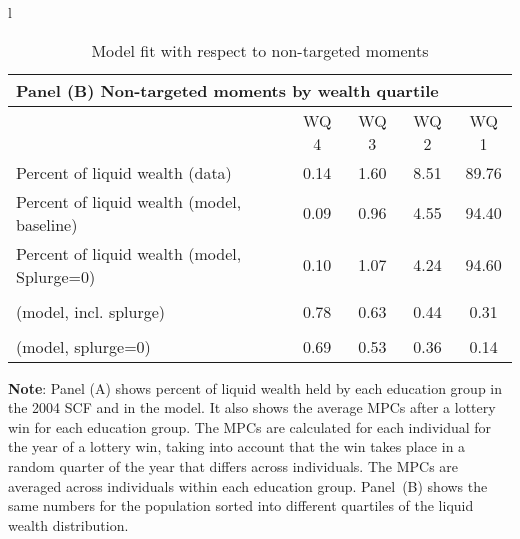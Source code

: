 \documentclass[\econtexRoot/HAFiscal]{subfiles}
\begin{document}
\begin{table}[th]
\begin{center}
\begin{tabular}{l}
			\begin{tabular}{lcccc}
				\multicolumn{5}{l}{Panel (B) Non-targeted moments by wealth quartile} \\ \midrule
				& WQ 4 & WQ 3 & WQ 2 & WQ 1 \\ \midrule
				Percent of liquid wealth (data) & 0.14 & 1.60 & 8.51 & 89.76 \\
				Percent of liquid wealth (model, baseline) & 0.09 & 0.96 & 4.55 & 94.40 \\
				Percent of liquid wealth (model, Splurge=0) & 0.10 & 1.07 & 4.24 & 94.60 \\
				\makecell[l]{Avg. lottery-win-year MPC \\ (model, incl. splurge)} & 0.78 & 0.63 & 0.44 & 0.31 \\
				\makecell[l]{Avg. lottery-win-year MPC \\ (model, splurge=0)} & 0.69 & 0.53 & 0.36 & 0.14
				\\ \bottomrule 
			\end{tabular}
		\end{tabular}
		\caption{Model fit with respect to non-targeted moments}
		\notinsubfile{\label{tab:nonTargetedMoments_wSplZero}}
		\parbox{16cm}{\small \vspace{.15cm} \textbf{Note}: Panel (A) shows percent of liquid wealth held by each education group in the 2004 SCF and in the model.
It also shows the average MPCs after a lottery win for each education group.
The MPCs are calculated for each individual for the year of a lottery win, taking into account that the win takes place in a random quarter of the year that differs across individuals.
The MPCs are averaged across individuals within each education group.
Panel~(B) shows the same numbers for the population sorted into different quartiles of the liquid wealth distribution.\normalsize}
	\end{center}
\end{table}
\end{document}
